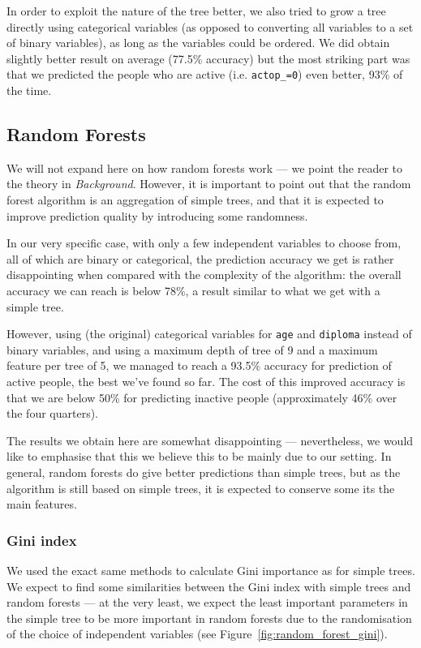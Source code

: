 In order to exploit the nature of the tree better, we also tried to grow a tree directly using categorical variables (as opposed to converting all variables to a set of binary variables), as long as the variables could be ordered. We did obtain slightly better result on average (77.5\% accuracy) but the most striking part was that we predicted the people who are active (i.e. \texttt{actop\_=0}) even better, 93\% of the time.


\subsection{Random Forests}

We will not expand here on how random forests work --- we point the reader to the theory in \textit{Background}. However, it is important to point out that the random forest algorithm is an aggregation of simple trees, and that it is expected to improve prediction quality by introducing some randomness.

In our very specific case, with only a few independent variables to choose from, all of which are binary or categorical, the prediction accuracy we get is rather disappointing when compared with the complexity of the algorithm: the overall accuracy we can reach is below 78\%, a result similar to what we get with a simple tree.

However, using (the original) categorical variables for \texttt{age} and \texttt{diploma} instead of binary variables, and using a maximum depth of tree of 9 and a maximum feature per tree of 5, we managed to reach a 93.5\% accuracy for prediction of active people, the best we’ve found so far. The cost of this improved accuracy is that we are below 50\% for predicting inactive people (approximately 46\% over the four quarters).

The results we obtain here are somewhat disappointing --- nevertheless, we would like to emphasise that this we believe this to be mainly due to our setting. In general, random forests do give better predictions than simple trees, but as the algorithm is still based on simple trees, it is expected to conserve some its the main features.

\subsubsection{Gini index}
We used the exact same methods to calculate Gini importance as for simple trees. We expect to find some similarities between the Gini index with simple trees and random forests --- at the very least, we expect the least important parameters in the simple tree to be more important in random forests due to the randomisation of the choice of independent variables (see Figure~\ref{fig:random_forest_gini}).

